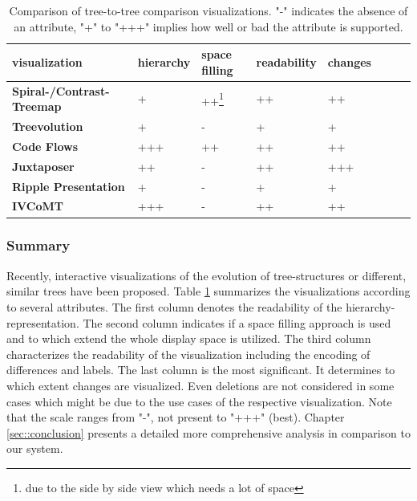 
\begin{table}[tb]
\begin{minipage}{\linewidth}
\centering 
\begin{tabularx}{0.9\textwidth}{|l|>{\centering\arraybackslash}X|>{\centering\arraybackslash}X|>{\centering\arraybackslash}X|>{\centering\arraybackslash}X|>{\centering\arraybackslash}X|>{\centering\arraybackslash}X|>{\centering\arraybackslash}X|} 
\hline
\textbf{visualization} & \textbf{hierarchy} & \textbf{space filling} & \textbf{readability} & \textbf{changes}\\
\hline
\hline
\textbf{Spiral-/Contrast-Treemap} & + & ++\footnote{due to the side by side view which needs a lot of space} & ++ & ++\\
\hline
\textbf{Treevolution} & + & - & + & +\\
\hline
\textbf{Code Flows} & +++ & ++ & ++ & ++\\
\hline
\textbf{Juxtaposer} & ++ & - & ++ & +++\\
\hline
\textbf{Ripple Presentation} & + & - & + & +\\
\hline
\textbf{IVCoMT} & +++ & - & ++ & ++ \\
\hline
\end{tabularx}
\label{chap2:Comparison}
\vspace{0.5em} 
\caption{Comparison of tree-to-tree comparison visualizations. "-" indicates the absence of an attribute, "+" to "+++" implies how well or bad the attribute is supported.}
\end{minipage}
\end{table}

\subsubsection{Summary}
Recently, interactive visualizations of the evolution of tree-structures or different, similar trees have been proposed. Table \ref{chap2:Comparison} summarizes the visualizations according to several attributes. The first column denotes the readability of the hierarchy-representation. The second column indicates if a space filling approach is used and to which extend the whole display space is utilized. The third column characterizes the readability of the visualization including the encoding of differences and labels. The last column is the most significant. It determines to which extent changes are visualized. Even deletions are not considered in some cases which might be due to the use cases of the respective visualization. Note that the scale ranges from "-", not present to "+++" (best). Chapter \ref{sec::conclusion} presents a detailed more comprehensive analysis in comparison to our system. 

